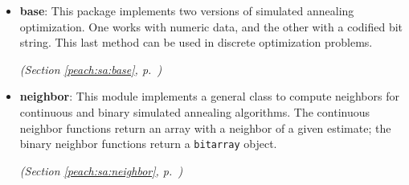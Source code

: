 \begin{itemize}
\setlength{\parskip}{0ex}
\item \textbf{base}: 
This package implements two versions of simulated annealing optimization. One
works with numeric data, and the other with a codified bit string. This last
method can be used in discrete optimization problems.


  \textit{(Section \ref{peach:sa:base}, p.~\pageref{peach:sa:base})}

\item \textbf{neighbor}: 
This module implements a general class to compute neighbors for continuous and
binary simulated annealing algorithms. The continuous neighbor functions return
an array with a neighbor of a given estimate; the binary neighbor functions
return a \texttt{bitarray} object.


  \textit{(Section \ref{peach:sa:neighbor}, p.~\pageref{peach:sa:neighbor})}

\end{itemize}

